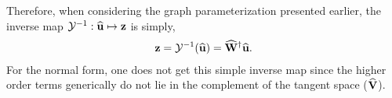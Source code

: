  Therefore, when considering the graph parameterization presented earlier, the inverse map $\mathrm{\mathcal{Y}^{-1}}: \widehat{\mathbf{u}} \mapsto \mathbf{z}$ is simply,
 \begin{align}
 	\label{eqn:inverse_map}
 	\mathbf{z} = \mathrm{\mathcal{Y}^{-1}}(\widehat{\mathbf{u}}) = \widehat{\mathbf{W}}^{\dagger}\widehat{\mathbf{u}}.
 \end{align}
 For the normal form, one does not get this simple inverse map since the higher order terms generically do not lie in the complement of the tangent space ($\widehat{\mathbf{V}}$). 
 
























